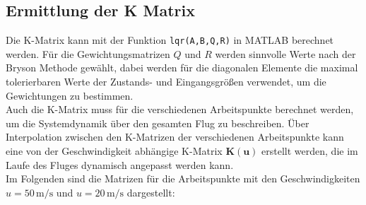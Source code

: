 \subsection{Ermittlung der K Matrix}
\label{subsec:k_matrix}
Die K-Matrix kann mit der Funktion \texttt{lqr(A,B,Q,R)} in MATLAB berechnet werden. Für die Gewichtungsmatrizen $Q$ und $R$ werden sinnvolle Werte nach der Bryson Methode gewählt, dabei werden für die diagonalen Elemente die maximal tolerierbaren Werte der Zustands- und Eingangsgrößen verwendet, um die Gewichtungen zu bestimmen.
\\
Auch die K-Matrix muss für die verschiedenen Arbeitspunkte berechnet werden, um die Systemdynamik über den gesamten Flug zu beschreiben. Über Interpolation zwischen den K-Matrizen der verschiedenen Arbeitspunkte kann eine von der Geschwindigkeit abhängige K-Matrix $\mathbf{K(u)}$ erstellt werden, die im Laufe des Fluges dynamisch angepasst werden kann.
\\
Im Folgenden sind die Matrizen für die Arbeitspunkte mit den Geschwindigkeiten $u = 50\,\mathrm{m/s}$ und $u = 20\,\mathrm{m/s}$ dargestellt:

